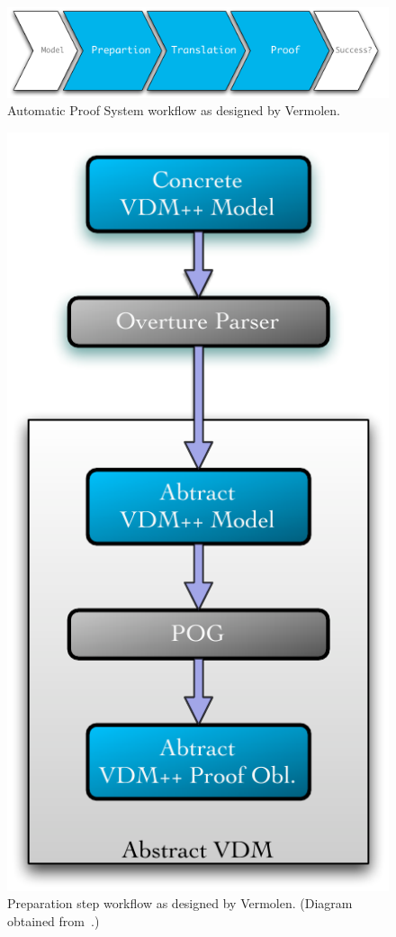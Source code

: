 \documentclass[]{article}
\begin{document}
\begin{figure}
  \begin{center}
    \includegraphics[width=.7\textwidth]{images/pic_arch.pdf}
    \caption[APS workflow]{Automatic Proof System workflow as designed by Vermolen.}
    \label{fig:sander_arch}
  \end{center}
\end{figure}

\begin{figure}
  \begin{center}
  \includegraphics[height=.35\textheight]{images/pic_preparation.pdf}
  \caption[Preparation workflow]{Preparation step workflow as designed by Vermolen. (Diagram obtained from~\cite{Vermolen07}.)}
  \label{fig:arch_preparation}
  \end{center}
\end{figure}
\end{document}
